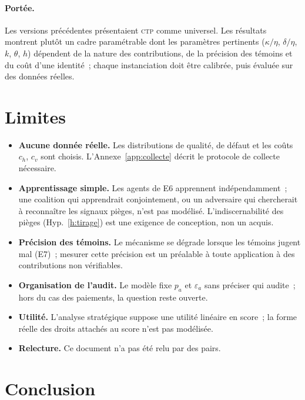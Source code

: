 \documentclass[11pt,a4paper]{article}
\theoremstyle{plain}
\theoremstyle{definition}
\theoremstyle{remark}
\newcommand{\CTP}{\textsc{ctp}}
\newcommand{\1}{\mathbf{1}}
\begin{document}
\paragraph{Portée.} Les versions précédentes présentaient \CTP{} comme
universel. Les résultats montrent plutôt un cadre paramétrable dont les
paramètres pertinents ($\kappa/\eta$, $\delta/\eta$, $k$, $\theta$, $h$)
dépendent de la nature des contributions, de la précision des témoins et du
coût d'une identité~; chaque instanciation doit être calibrée, puis évaluée sur
des données réelles.

\section{Limites}
\label{sec:limites}

\begin{itemize}
  \item \textbf{Aucune donnée réelle.} Les distributions de qualité, de défaut
    et les coûts $c_h$, $c_v$ sont choisis. L'Annexe~\ref{app:collecte} décrit
    le protocole de collecte nécessaire.
  \item \textbf{Apprentissage simple.} Les agents de E6 apprennent
    indépendamment~; une coalition qui apprendrait conjointement, ou un
    adversaire qui chercherait à reconnaître les signaux pièges, n'est pas
    modélisé. L'indiscernabilité des pièges (Hyp.~\ref{h:tirage}) est
    une exigence de conception, non un acquis.
  \item \textbf{Précision des témoins.} Le mécanisme se dégrade lorsque les
    témoins jugent mal (E7)~; mesurer cette précision est un préalable à toute
    application à des contributions non vérifiables.
  \item \textbf{Organisation de l'audit.} Le modèle fixe $p_a$ et
    $\varepsilon_a$ sans préciser qui audite~; hors du cas des paiements, la
    question reste ouverte.
  \item \textbf{Utilité.} L'analyse stratégique suppose une utilité linéaire en
    score~; la forme réelle des droits attachés au score n'est pas modélisée.
  \item \textbf{Relecture.} Ce document n'a pas été relu par des pairs.
\end{itemize}

\section{Conclusion}
\end{document}

